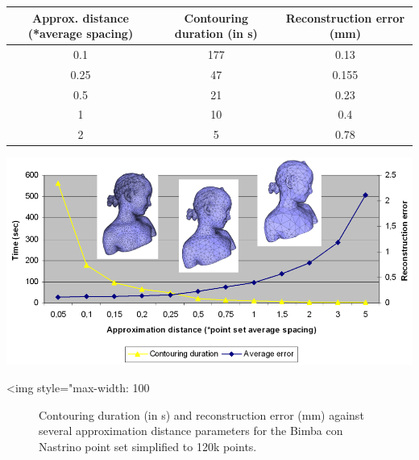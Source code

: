 \begin{tabular}{|c|c|c|}
  \hline
  Approx. distance (*average spacing)    & Contouring duration (in s) & Reconstruction error (mm) \\
  \hline
  0.1                                    & 177                       & 0.13 \\
  0.25                                   & 47                        & 0.155 \\
  0.5                                    & 21                        & 0.23 \\
  1                                      & 10                        & 0.4 \\
  2                                      & 5                         & 0.78 \\
  \hline
\end{tabular}

\begin{center}
    \begin{ccTexOnly}
      \includegraphics[width=1.0\textwidth]{Surface_reconstruction_points_3/contouring_bench}
    \end{ccTexOnly}
    \begin{ccHtmlOnly}
        <img style="max-width: 100%
    \end{ccHtmlOnly}
    \begin{figure}[h]
        \caption{Contouring duration (in s) and reconstruction error (mm)
                 against several approximation distance parameters
                 for the Bimba con Nastrino point set simplified to 120k points.}
        \label{Surface_reconstruction_points_3-fig-contouring_bench}
    \end{figure}
\end{center}



